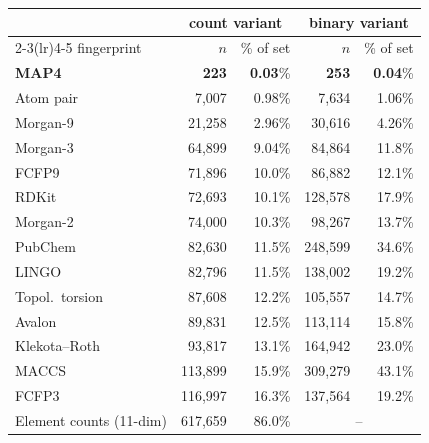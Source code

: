 %
\begin{table}[t]
\centering
\begin{tabular}{lrrrr}
\toprule
& \multicolumn{2}{c}{count variant} & \multicolumn{2}{c}{binary variant} \\
\cmidrule(lr){2-3}\cmidrule(lr){4-5}
fingerprint & $n$ & \% of set & $n$ & \% of set \\
\midrule
\textbf{MAP4} & \textbf{223} & \textbf{0.03}\% & \textbf{253} & \textbf{0.04}\% \\
Atom pair & 7{,}007 & 0.98\% & 7{,}634 & 1.06\% \\
Morgan-9 & 21{,}258 & 2.96\% & 30{,}616 & 4.26\% \\
Morgan-3 & 64{,}899 & 9.04\% & 84{,}864 & 11.8\% \\
FCFP9 & 71{,}896 & 10.0\% & 86{,}882 & 12.1\% \\
RDKit & 72{,}693 & 10.1\% & 128{,}578 & 17.9\% \\
Morgan-2 & 74{,}000 & 10.3\% & 98{,}267 & 13.7\% \\
PubChem & 82{,}630 & 11.5\% & 248{,}599 & 34.6\% \\
LINGO & 82{,}796 & 11.5\% & 138{,}002 & 19.2\% \\
Topol.\ torsion & 87{,}608 & 12.2\% & 105{,}557 & 14.7\% \\
Avalon & 89{,}831 & 12.5\% & 113{,}114 & 15.8\% \\
Klekota--Roth & 93{,}817 & 13.1\% & 164{,}942 & 23.0\% \\
MACCS & 113{,}899 & 15.9\% & 309{,}279 & 43.1\% \\
FCFP3 & 116{,}997 & 16.3\% & 137{,}564 & 19.2\% \\
\addlinespace
Element counts (11-dim) & 617{,}659 & 86.0\% & \multicolumn{2}{c}{--} \\
\bottomrule
\end{tabular}

\end{table}
